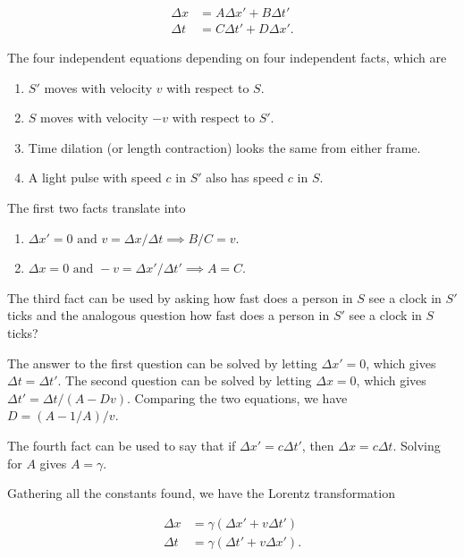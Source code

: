 \documentclass[english,a4paper,12pt]{report}
\begin{document}
\begin{equation}
    \begin{aligned}
        \Delta x &= A \Delta x' + B \Delta t' \\
        \Delta t &= C \Delta t' + D \Delta x'. 
    \end{aligned}
\end{equation}

The four independent equations depending on four independent facts, which are 

\begin{enumerate}
    \item \(S'\) moves with velocity \(v\) with respect to \(S\).
    \item \(S\)  moves with velocity \(-v\) with respect to \(S'\).
    \item Time dilation (or length contraction) looks the same from either frame.
    \item A light pulse with speed \(c\) in \(S'\) also has speed \(c\)  in \(S\).
\end{enumerate}

The first two facts translate into

\begin{enumerate}
    \item \( \Delta x' = 0 \text { and } v = \Delta x/\Delta t \implies B /C = v \).
    \item \( \Delta x = 0 \text { and } -v = \Delta x' /\Delta t'\implies A = C \).  
\end{enumerate}

The third fact can be used by asking how fast does a person in \(S\) see a clock in \(S'\) ticks and the analogous question how fast does a person in \(S'\) see a clock in \(S\) ticks? 

The answer to the first question can be solved by letting \(\Delta x' = 0\), which gives \(\Delta t = \Delta t'\). The second question can be solved by letting \(\Delta x = 0\), which gives \(\Delta t' = \Delta t/(A-Dv) \). Comparing the two equations, we have \(D = (A-1 /A )/v \). 

The fourth fact can be used to say that if \(\Delta x' = c \Delta t'\), then \(\Delta x = c \Delta t\). Solving for \(A\)  gives \(A = \gamma \). 

Gathering all the constants found, we have the Lorentz transformation

\begin{equation}
    \begin{aligned}
    \Delta x &= \gamma (\Delta x' + v \Delta t') \\
    \Delta t &= \gamma (\Delta t' + v \Delta x').
    \end{aligned}
\end{equation}
\end{document}
